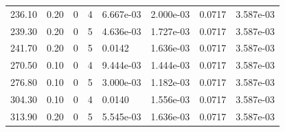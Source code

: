 \documentclass[preview]{standalone}
\begin{document}
{{\begin{tabular}{L{1.2cm}C{1.2cm} C{0.3cm}C{0.5cm} C{1.4cm}C{1.4cm} C{1.4cm}C{1.4cm}}
  236.10  &  0.20  & 0     &  4 &  6.667e-03  & 2.000e-03  & 0.0717 &  3.587e-03   \\ 
  239.30  &  0.20  & 0     &  5 &  4.636e-03  & 1.727e-03  & 0.0717 &  3.587e-03   \\ 
  241.70  &  0.20  & 0     &  5 &  0.0142  & 1.636e-03  & 0.0717 &  3.587e-03   \\ 
  270.50  &  0.10  & 0     &  4 &  9.444e-03  & 1.444e-03  & 0.0717 &  3.587e-03   \\ 
  276.80  &  0.10  & 0     &  5 &  3.000e-03  & 1.182e-03  & 0.0717 &  3.587e-03   \\ 
  304.30  &  0.10  & 0     &  4 &  0.0140  & 1.556e-03  & 0.0717 &  3.587e-03   \\ 
  313.90  &  0.20  & 0     &  5 &  5.545e-03  & 1.636e-03  & 0.0717 &  3.587e-03   \\ 
\hline 
\end{tabular} 

}}
\end{document}
